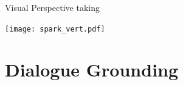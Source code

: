 \documentclass[xcolor=table]{beamer}
\begin{document}

\begin{frame}{Visual Perspective taking}


        \centering
        \texttt{[image: spark\_vert.pdf]}

\end{frame}




\section{Dialogue Grounding}

\end{document}

